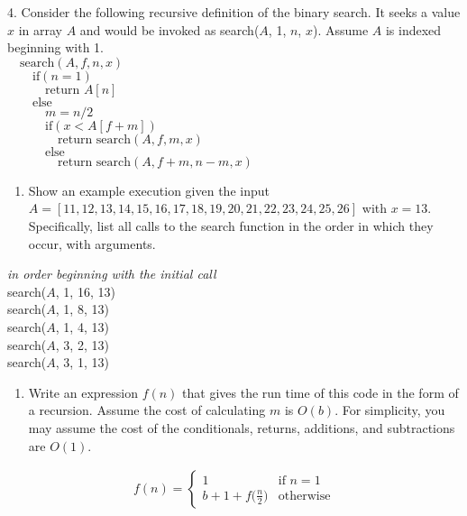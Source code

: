 \documentclass[12pt]{article}
\begin{document}
\begin{flushleft}
4. Consider the following recursive definition of the binary search. It seeks a value $x$ in array $A$ and would be invoked as search($A$, 1, $n$, $x$). Assume $A$ is indexed beginning with 1.\\[.2in]
$\quad \text{search}(A, f, n, x)$\\
$\qquad \text{if}(n=1)$\\
$\quad \qquad \text{return } A[n]$\\
$\qquad \text{else}$\\
$\quad \qquad m=n/2$\\
$\quad \qquad \text{if}(x<A[f+m])$\\
$\qquad \qquad \text{return search}(A, f, m, x)$\\
$\quad \qquad \text{else}$\\
$\qquad \qquad \text{return search}(A, f+m, n-m, x)$\\
\end{flushleft}
\begin{enumerate}[label=A.]
\item Show an example execution given the input\\ $A=[11,12,13,14,15,16,17,18,19,20,21,22,23,24,25,26]$ with $x=13$.\\
Specifically, list all calls to the search function in the order in which they occur, with arguments.
\end{enumerate}
\begin{center}
\textit{in order beginning with the initial call}\\
search($A$, 1, 16, 13)\\
search($A$, 1, 8, 13)\\
search($A$, 1, 4, 13)\\
search($A$, 3, 2, 13)\\
search($A$, 3, 1, 13)\\
\end{center}
\begin{enumerate}[label=B.]
\item Write an expression $f(n)$ that gives the run time of this code in the form of a recursion. Assume the cost of calculating $m$ is $O(b)$. For simplicity, you may assume the cost of the conditionals, returns, additions, and subtractions are $O(1)$.
\end{enumerate}
\begin{align*}
f(n)=
\begin{cases}
1 & \text{if } n=1\\
b+1+f\big(\frac{n}{2}\big) & \text{otherwise}
\end{cases}
\end{align*}
\end{document}
